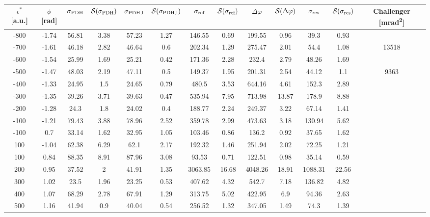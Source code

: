 \begin{landscape}
	
	\begin{table}
	\centering
	\begin{tabular}{|c|c|c|c|c|c|c|c|c|c|c|c|c|}
		\hline
		$\epsilon^*$ [a.u.] & $\phi$ [\si{\radian}] & $\sigma_{\text{PDH}}$ & $\mathcal{S}(\sigma_{\text{PDH}})$ & $\sigma_{\text{PDH,l}}$ & $\mathcal{S}(\sigma_{\text{PDH,l}})$  & $\sigma_{\text{ref}}$ & $\mathcal{S}(\sigma_{\text{ref}})$ & $\Delta \varphi$ & $\mathcal{S}(\Delta \varphi)$ & $\sigma_{\text{res}}$  & $\mathcal{S}(\sigma_{\text{res}})$ & Challenger [\si{\milli\radian\squared}] \\
		\hline
		\hline
		-800 & -1.74 & 56.81 & 3.38 & 57.23 & 1.27 & 146.55 & 0.69 & 199.55 & 0.96 & 39.3 & 0.93 & \\
		-700 & -1.61 & 46.18 & 2.82 & 46.64 & 0.6 & 202.34 & 1.29 & 275.47 & 2.01 & 54.4 & 1.08 & 13518\\
		-600 & -1.54 & 25.99 & 1.69 & 25.21 & 0.42 & 171.36 & 2.28 & 232.4 & 2.79 & 48.26 & 1.69 & \\
		-500 & -1.47 & 48.03 & 2.19 & 47.11 & 0.5 & 149.37 & 1.95 & 201.31 & 2.54 & 44.12 & 1.1 & 9363\\
		-400 & -1.33 & 24.95 & 1.5 & 24.65 & 0.79 & 480.5 & 3.53 & 644.16 & 4.61 & 152.3 & 2.89 & \\
		-300 & -1.35 & 39.26 & 3.71 & 39.63 & 0.47 & 535.94 & 7.95 & 713.98 & 13.87 & 178.9 & 8.88 & \\
		-200 & -1.28 & 24.3 & 1.8 & 24.02 & 0.4 & 188.77 & 2.24 & 249.37 & 3.22 & 67.14 & 1.41 & \\
		-100 & -1.21 & 79.43 & 3.88 & 78.96 & 2.52 & 359.78 & 2.99 & 473.63 & 3.18 & 130.94 & 5.62 & \\
		-100 & 0.7 & 33.14 & 1.62 & 32.95 & 1.05 & 103.46 & 0.86 & 136.2 & 0.92 & 37.65 & 1.62 & \\
		100 & -1.04 & 62.38 & 6.29 & 62.1 & 2.17 & 192.32 & 1.46 & 251.94 & 2.02 & 72.25 & 1.21 & \\
		100 & 0.84 & 88.35 & 8.91 & 87.96 & 3.08 & 93.53 & 0.71 & 122.51 & 0.98 & 35.14 & 0.59 & \\
		200 & 0.95 & 37.52 & 2 & 41.91 & 1.35 & 3063.85 & 16.68 & 4048.26 & 18.91 & 1088.31 & 22.56 & \\
		300 & 1.02 & 23.5 & 1.96 & 23.25 & 0.53 & 407.62 & 4.32 & 542.7 & 7.18 & 136.82 & 4.82 & \\
		400 & 1.07 & 68.29 & 2.78 & 67.91 & 1.29 & 313.75 & 5.02 & 422.95 & 6.9 & 94.36 & 2.63 & \\
		500 & 1.16 & 41.94 & 0.9 & 40.04 & 0.54 & 256.52 & 1.32 & 347.05 & 1.49 & 74.3 & 1.39 & \\

\end{tabular}
\end{table}
\end{landscape}
